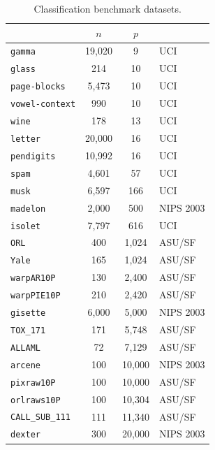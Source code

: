 \begin{table}[H]
  \centering
  \scriptsize
  \setlength{\tabcolsep}{5pt}
  \renewcommand{\arraystretch}{1.0}
  \begin{tabular}{@{}lS[table-format=5.0]S[table-format=5.0]l@{}}
    \toprule
     & {$n$} & {$p$} &  \\
    \midrule
    \nolinkurl{gamma} & 19,020 & 9 & UCI \\
    \nolinkurl{glass} & 214 & 10 & UCI \\
    \nolinkurl{page-blocks} & 5,473 & 10 & UCI \\
    \nolinkurl{vowel-context} & 990 & 10 & UCI \\
    \nolinkurl{wine} & 178 & 13 & UCI \\
    \nolinkurl{letter} & 20,000 & 16 & UCI \\
    \nolinkurl{pendigits} & 10,992 & 16 & UCI \\
    \nolinkurl{spam} & 4,601 & 57 & UCI \\
    \nolinkurl{musk} & 6,597 & 166 & UCI \\
    \nolinkurl{madelon} & 2,000 & 500 & NIPS 2003 \\
    \nolinkurl{isolet} & 7,797 & 616 & UCI \\
    \nolinkurl{ORL} & 400 & 1,024 & ASU/SF \\
    \nolinkurl{Yale} & 165 & 1,024 & ASU/SF \\
    \nolinkurl{warpAR10P} & 130 & 2,400 & ASU/SF \\
    \nolinkurl{warpPIE10P} & 210 & 2,420 & ASU/SF \\
    \nolinkurl{gisette} & 6,000 & 5,000 & NIPS 2003 \\
    \nolinkurl{TOX_171} & 171 & 5,748 & ASU/SF \\
    \nolinkurl{ALLAML} & 72 & 7,129 & ASU/SF \\
    \nolinkurl{arcene} & 100 & 10,000 & NIPS 2003 \\
    \nolinkurl{pixraw10P} & 100 & 10,000 & ASU/SF \\
    \nolinkurl{orlraws10P} & 100 & 10,304 & ASU/SF \\
    \nolinkurl{CALL_SUB_111} & 111 & 11,340 & ASU/SF \\
    \nolinkurl{dexter} & 300 & 20,000 & NIPS 2003 \\
    \bottomrule
  \end{tabular}
  \caption{Classification benchmark datasets.}
  \label{tab:benchmark-dataset-inventory-clf}
\end{table}

